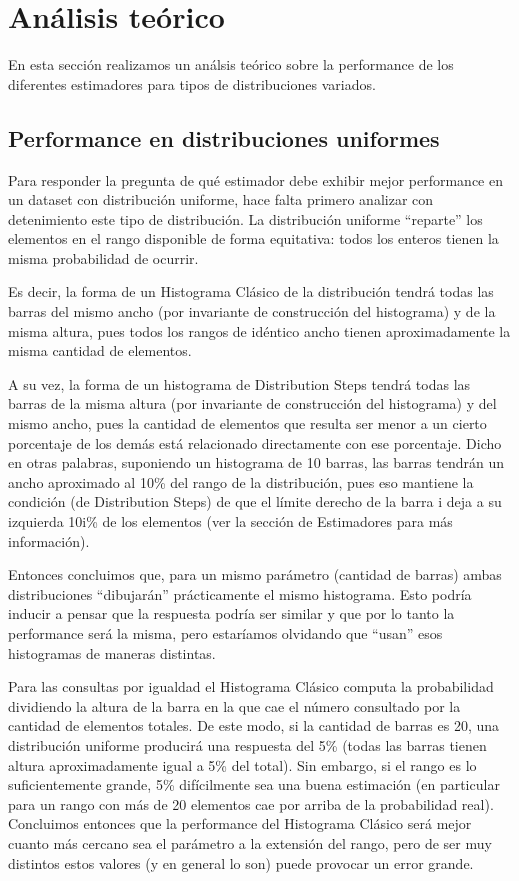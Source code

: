 \section{Análisis teórico}
En esta sección realizamos un análsis teórico sobre la performance de los diferentes estimadores para tipos de distribuciones variados.

\subsection{Performance en distribuciones uniformes}
Para responder la pregunta de qué estimador debe exhibir mejor performance en un dataset con distribución uniforme, hace falta primero analizar con detenimiento este tipo de distribución. La distribución uniforme ``reparte'' los elementos en el rango disponible de forma equitativa: todos los enteros tienen la misma probabilidad de ocurrir.

Es decir, la forma de un Histograma Clásico de la distribución tendrá todas las barras del mismo ancho (por invariante de construcción del histograma) y de la misma altura, pues todos los rangos de idéntico ancho tienen aproximadamente la misma cantidad de elementos.

A su vez, la forma de un histograma de Distribution Steps tendrá todas las barras de la misma altura (por invariante de construcción del histograma) y del mismo ancho, pues la cantidad de elementos que resulta ser menor a un cierto porcentaje de los demás está relacionado directamente con ese porcentaje. Dicho en otras palabras, suponiendo un histograma de 10 barras, las barras tendrán un ancho aproximado al 10\% del rango de la distribución, pues eso mantiene la condición (de Distribution Steps) de que el límite derecho de la barra i deja a su izquierda 10i\% de los elementos (ver la sección de Estimadores para más información).

Entonces concluimos que, para un mismo parámetro (cantidad de barras) ambas distribuciones ``dibujarán'' prácticamente el mismo histograma. Esto podría inducir a pensar que la respuesta podría ser similar y que por lo tanto la performance será la misma, pero estaríamos olvidando que ``usan'' esos histogramas de maneras distintas.

Para las consultas por igualdad el Histograma Clásico computa la probabilidad dividiendo la altura de la barra en la que cae el número consultado por la cantidad de elementos totales. De este modo, si la cantidad de barras es 20, una distribución uniforme producirá una respuesta del 5\% (todas las barras tienen altura aproximadamente igual a 5\% del total). Sin embargo, si el rango es lo suficientemente grande, 5\% difícilmente sea una buena estimación (en particular para un rango con más de 20 elementos cae por arriba de la probabilidad real). Concluimos entonces que la performance del Histograma Clásico será mejor cuanto más cercano sea el parámetro a la extensión del rango, pero de ser muy distintos estos valores (y en general lo son) puede provocar un error grande.

